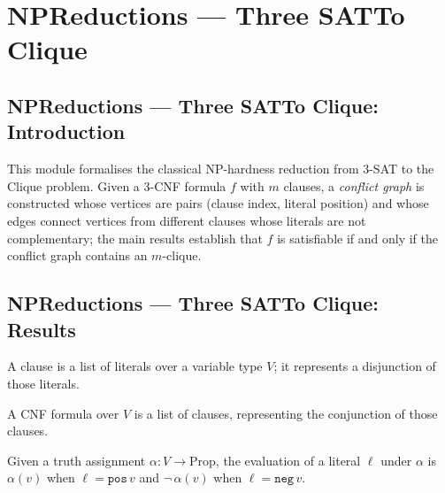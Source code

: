\section{NPReductions --- Three SATTo Clique}
\subsection*{NPReductions --- Three SATTo Clique: Introduction}

This module formalises the classical NP-hardness reduction from 3-SAT to the Clique
problem.  Given a 3-CNF formula $f$ with $m$ clauses, a \emph{conflict graph} is
constructed whose vertices are pairs (clause index, literal position) and whose edges
connect vertices from different clauses whose literals are not complementary; the main
results establish that $f$ is satisfiable if and only if the conflict graph contains
an $m$-clique.

\subsection*{NPReductions --- Three SATTo Clique: Results}

\begin{definition}[Clause]
\label{ThreeSATToClique.Clause}
\leanok
{}
A clause is a list of literals over a variable type $V$; it represents a
disjunction of those literals.
\end{definition}

\begin{definition}
\label{ThreeSATToClique.CNFFormula}
\leanok
{}
A CNF formula over $V$ is a list of clauses, representing the conjunction of those
clauses.
\end{definition}

\begin{definition}
\label{ThreeSATToClique.evalLiteral}
\leanok
{}
Given a truth assignment $\alpha : V \to \mathrm{Prop}$, the evaluation of a
literal $\ell$ under $\alpha$ is $\alpha(v)$ when $\ell = \texttt{pos}\,v$ and
$\neg\,\alpha(v)$ when $\ell = \texttt{neg}\,v$.
\end{definition}

